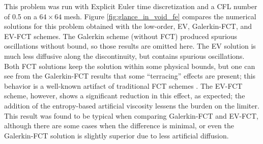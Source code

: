 This problem was run with Explicit Euler time discretization and a CFL
number of 0.5 on a $64\times64$ mesh. Figure \ref{fig:glance_in_void_fe}
compares the numerical solutions for this problem obtained with the
low-order, EV, Galerkin-FCT, and EV-FCT schemes. The Galerkin scheme
(without FCT) produced spurious oscillations without bound, so those
results are omitted here. The EV solution is much less diffusive along
the discontinuity, but contains spurious oscillations. Both FCT solutions
keep the solution within some physical bounds, but one can see from
the Galerkin-FCT results that some ``terracing'' effects are present; this
behavior is a well-known artifact of traditional FCT schemes \cite{kuzmin_FCT}.
The EV-FCT scheme, however, shows a significant reduction in this effect,
as expected; the addition of the entropy-based artificial viscosity
lessens the burden on the limiter. This result was found to be typical
when comparing Galerkin-FCT and EV-FCT, although there are some cases
when the difference is minimal, or even the Galerkin-FCT solution is slightly
superior due to less artificial diffusion.

